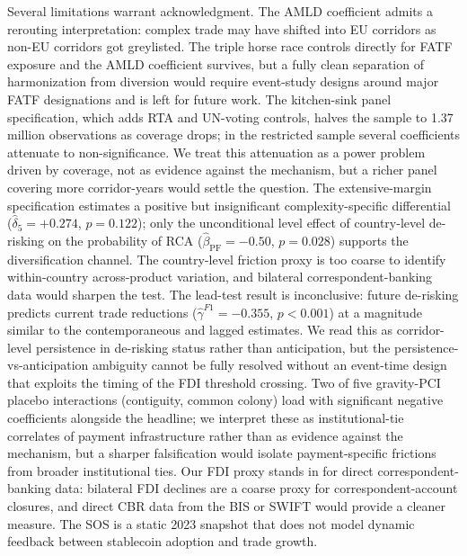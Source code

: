 Several limitations warrant acknowledgment. The AMLD coefficient admits a rerouting interpretation: complex trade may have shifted into EU corridors as non-EU corridors got greylisted. The triple horse race controls directly for FATF exposure and the AMLD coefficient survives, but a fully clean separation of harmonization from diversion would require event-study designs around major FATF designations and is left for future work. The kitchen-sink panel specification, which adds RTA and UN-voting controls, halves the sample to 1.37 million observations as coverage drops; in the restricted sample several coefficients attenuate to non-significance. We treat this attenuation as a power problem driven by coverage, not as evidence against the mechanism, but a richer panel covering more corridor-years would settle the question. The extensive-margin specification estimates a positive but insignificant complexity-specific differential ($\hat{\delta}_5 = +0.274$, $p = 0.122$); only the unconditional level effect of country-level de-risking on the probability of RCA ($\hat{\beta}_{\text{PF}} = -0.50$, $p = 0.028$) supports the diversification channel. The country-level friction proxy is too coarse to identify within-country across-product variation, and bilateral correspondent-banking data would sharpen the test. The lead-test result is inconclusive: future de-risking predicts current trade reductions ($\hat{\gamma}^{F1} = -0.355$, $p < 0.001$) at a magnitude similar to the contemporaneous and lagged estimates. We read this as corridor-level persistence in de-risking status rather than anticipation, but the persistence-vs-anticipation ambiguity cannot be fully resolved without an event-time design that exploits the timing of the FDI threshold crossing. Two of five gravity-PCI placebo interactions (contiguity, common colony) load with significant negative coefficients alongside the headline; we interpret these as institutional-tie correlates of payment infrastructure rather than as evidence against the mechanism, but a sharper falsification would isolate payment-specific frictions from broader institutional ties. Our FDI proxy stands in for direct correspondent-banking data: bilateral FDI declines are a coarse proxy for correspondent-account closures, and direct CBR data from the BIS or SWIFT would provide a cleaner measure. The SOS is a static 2023 snapshot that does not model dynamic feedback between stablecoin adoption and trade growth.

